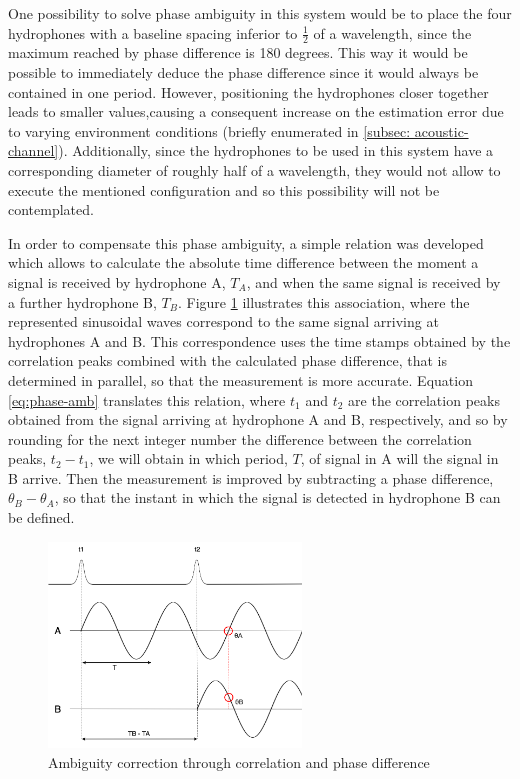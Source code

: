 
One possibility to solve phase ambiguity in this system would be to place the four hydrophones with a baseline spacing inferior to $\frac{1}{2}$ of a wavelength, since the maximum reached by phase difference is 180 degrees. This way it would be possible to immediately deduce the phase difference since it would always be contained in one period. However, positioning the hydrophones closer together leads to smaller  values,causing a consequent increase on the estimation error due to varying environment conditions (briefly enumerated in \ref{subsec: acoustic-channel}). Additionally, since the hydrophones to be used in this system have a corresponding diameter of roughly half of a wavelength, they would not allow to execute the mentioned configuration and so this possibility will not be contemplated.

In order to compensate this phase ambiguity, a simple relation was developed which allows to calculate the absolute time difference between the moment a signal is received by hydrophone A, $T_A$, and when the same signal is received by a further hydrophone B, $T_B$. Figure \ref{fig:ambiguity} illustrates this association, where the represented sinusoidal waves correspond to the same signal arriving at hydrophones A and B. This correspondence uses the time stamps obtained by the correlation peaks combined with the calculated phase difference, that is determined in parallel, so that the measurement is more accurate. Equation \ref{eq:phase-amb} translates this relation, where $t_1$ and $t_2$ are the correlation peaks obtained from the signal arriving at hydrophone A and B, respectively, and so by rounding for the next integer number the difference between the correlation peaks, $t_2 - t_1$, we will obtain in which period, $T$, of signal in A will the signal in B arrive. Then the measurement is improved by subtracting a phase difference, $\theta_B - \theta_A$, so that the instant in which the signal is detected in hydrophone B can be defined. 

\begin{figure}[!htbp]
	\centering
	\includegraphics[width=0.6\textwidth]{figures/ambiguity}
	\captionsetup{justification=centering,margin=2cm}
	\caption{Ambiguity correction through correlation and phase difference}
	\label{fig:ambiguity}
\end{figure}

